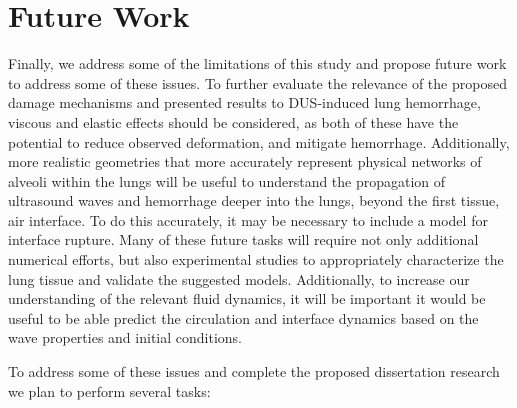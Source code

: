 \section{Future Work} \label{sec:usbe_lung_future}%
Finally, we address some of the limitations of this study and propose
future work to address some of these issues. To further evaluate the
relevance of the proposed damage mechanisms and presented results to
\ac{DUS}-induced lung hemorrhage, viscous and elastic effects should
be considered, as both of these have the potential to reduce observed
deformation, and mitigate hemorrhage. Additionally, more realistic
geometries that more accurately represent physical networks of alveoli
within the lungs will be useful to understand the propagation of
ultrasound waves and hemorrhage deeper into the lungs, beyond the
first tissue, air interface. To do this accurately, it may be
necessary to include a model for interface rupture. Many of these
future tasks will require not only additional numerical efforts, but
also experimental studies to appropriately characterize the lung
tissue and validate the suggested models. Additionally, to increase
our understanding of the relevant fluid dynamics, it will be important
it would be useful to be able predict the circulation and interface
dynamics based on the wave properties and initial conditions.

To address some of these issues and complete the proposed dissertation
research we plan to perform several tasks:

